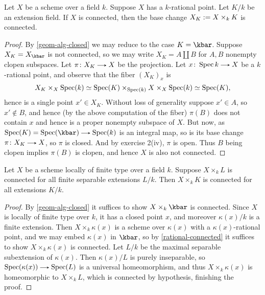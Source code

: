 \begin{proposition}
  \label{rational-connected}
  Let $X$ be a scheme over a field $k$. Suppose $X$ has a $k$-rational point. Let $K/k$ be an extension field. If $X$ is connected, then the base change $X_K \mathrel{:=} X \times_k K$ is connected.

  \begin{proof}
    By \cref{geom-alg-closed} we may reduce to the case $K = \kbar$. Suppose $X_K = X_{\kbar}$ is not connected, so we may write $X_K = A \amalg B$ for $A,B$ nonempty clopen subspaces. Let $\pi \c X_K \to X$ be the projection. Let $x \c \Spec k \to X$ be a $k$-rational point, and observe that the fiber $(X_K)_x$ is
    \[
      X_K \times_X \operatorname{Spec}(k) \simeq \operatorname{Spec}(K) \times_{\operatorname{Spec}(k)} X \times_X \operatorname{Spec}(k) \simeq \operatorname{Spec}(K),
    \]
     hence is a single point $x' \in X_K$. Without loss of generality suppose $x' \in A$, so $x' \notin B$, and hence (by the above computation of the fiber) $\pi(B)$ does not contain $x$ and hence is a proper nonempty subspace of $X$. But now, as $\Spec(K) = \Spec(\kbar) \to \Spec(k)$ is an integral map, so is its base change $\pi \c X_K \to X$, so $\pi$ is closed. And by exercise 2(iv), $\pi$ is open. Thus $B$ being clopen implies $\pi(B)$ is clopen, and hence $X$ is also not connected.
  \end{proof}
\end{proposition}

\begin{proposition}
  \label{geom-connected}
  Let $X$ be a scheme locally of finite type over a field $k$. Suppose $X \times_k L$ is connected for all finite separable extensions $L/k$. Then $X \times_k K$ is connected for all extensions $K/k$.

  \begin{proof}
    By \cref{geom-alg-closed} it suffices to show $X \times_k \kbar$ is connected. Since $X$ is locally of finite type over $k$, it has a closed point $x$, and moreover $\kappa(x)/k$ is a finite extension. Then $X \times_k \kappa(x)$ is a scheme over $\kappa(x)$ with a $\kappa(x)$-rational point, and we may embed $\kappa(x)$ in $\kbar$, so by \cref{rational-connected} it suffices to show $X \times_k \kappa(x)$ is connected. Let $L/k$ be the maximal separable subextension of $\kappa(x)$. Then $\kappa(x)/L$ is purely inseparable, so $\Spec(\kappa(x)) \to \Spec(L)$ is a universal homeomorphism, and thus $X \times_k \kappa(x)$ is homeomorphic to $X \times_k L$, which is connected by hypothesis, finishing the proof.
  \end{proof}
\end{proposition}



